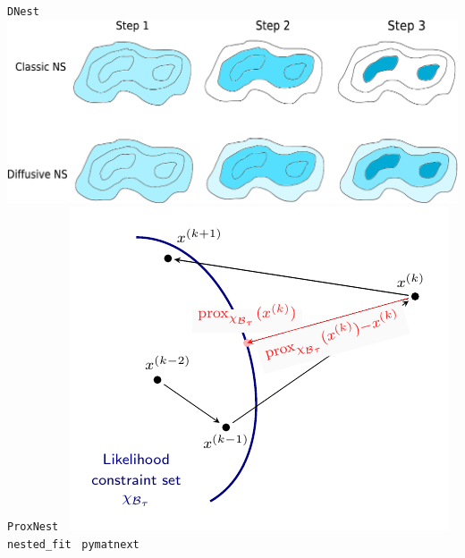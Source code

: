 \documentclass[aspectratio=169]{beamer}
\begin{document}
\begin{frame}
\begin{columns}[t]
{        }
        \vfill
        \texttt{DNest}~
        \includegraphics[width=\textwidth]{figures/dnest}
        \texttt{ProxNest}~
        \includegraphics[width=\textwidth]{figures/proxnest_diagram}
        \texttt{nested\_fit}~
        \texttt{pymatnext}~
        \vfill
    \end{columns}
\end{frame}
\end{document}
